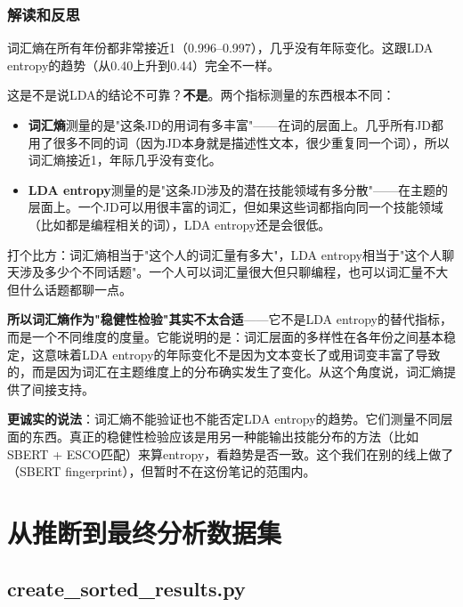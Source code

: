 \documentclass[12pt,a4paper]{ctexart}
\begin{document}
\subsubsection{解读和反思}

词汇熵在所有年份都非常接近1（0.996--0.997），几乎没有年际变化。这跟LDA entropy的趋势（从0.40上升到0.44）完全不一样。

这是不是说LDA的结论不可靠？\textbf{不是}。两个指标测量的东西根本不同：

\begin{itemize}
\item \textbf{词汇熵}测量的是"这条JD的用词有多丰富"——在词的层面上。几乎所有JD都用了很多不同的词（因为JD本身就是描述性文本，很少重复同一个词），所以词汇熵接近1，年际几乎没有变化。
\item \textbf{LDA entropy}测量的是"这条JD涉及的潜在技能领域有多分散"——在主题的层面上。一个JD可以用很丰富的词汇，但如果这些词都指向同一个技能领域（比如都是编程相关的词），LDA entropy还是会很低。
\end{itemize}

打个比方：词汇熵相当于"这个人的词汇量有多大"，LDA entropy相当于"这个人聊天涉及多少个不同话题"。一个人可以词汇量很大但只聊编程，也可以词汇量不大但什么话题都聊一点。

\textbf{所以词汇熵作为"稳健性检验"其实不太合适}——它不是LDA entropy的替代指标，而是一个不同维度的度量。它能说明的是：词汇层面的多样性在各年份之间基本稳定，这意味着LDA entropy的年际变化不是因为文本变长了或用词变丰富了导致的，而是因为词汇在主题维度上的分布确实发生了变化。从这个角度说，词汇熵提供了间接支持。

\textbf{更诚实的说法}：词汇熵不能验证也不能否定LDA entropy的趋势。它们测量不同层面的东西。真正的稳健性检验应该是用另一种能输出技能分布的方法（比如SBERT + ESCO匹配）来算entropy，看趋势是否一致。这个我们在别的线上做了（SBERT fingerprint），但暂时不在这份笔记的范围内。


\section{从推断到最终分析数据集}
\label{sec:final-dataset}

\subsection{create\_sorted\_results.py}
\end{document}
